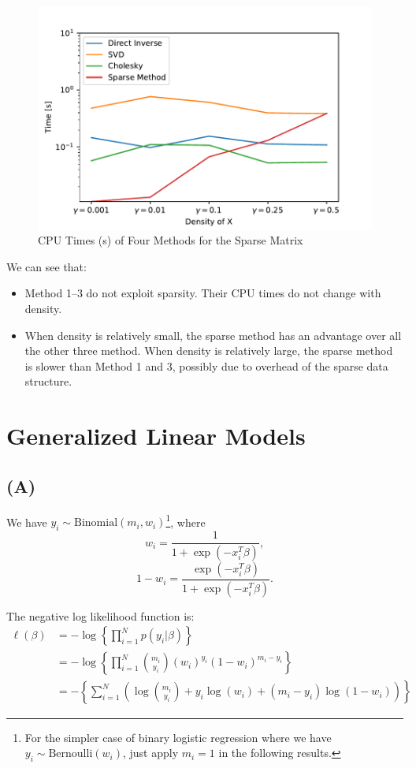 \documentclass[a4paper,11pt]{article}
\begin{document}
\begin{figure}[!h]
\caption{CPU Times (s) of Four Methods for the Sparse Matrix}
\centering
\includegraphics[width = \textwidth]{fig1}
\end{figure}

We can see that:
\begin{itemize}
	\item Method 1--3 do not exploit sparsity. Their CPU times do not change with density.
	\item When density is relatively small, the sparse method has an advantage over all the other three method. When density is relatively large, the sparse method is slower than Method 1 and 3, possibly due to overhead of the sparse data structure.
\end{itemize} 

\section{Generalized Linear Models}

\subsection{(A)}
We have $y_i \sim \text{Binomial}(m_i, w_i)$\footnote{For the simpler case of binary logistic regression where we have $y_i \sim \text{Bernoulli}(w_i)$, just apply $m_i = 1$ in the following results.}, where 
$$
		w_i = \frac{1}{1+\exp(-x_i^T\beta)},
$$
$$
1-w_i = \frac{\exp(-x_i^T\beta)}{1+\exp(-x_i^T\beta)}.
$$

The negative log likelihood function is:
\begin{align}
		\ell(\beta) &= -\log \left \{ \prod_{i=1}^N p(y_i | \beta)  \right \} \\
		&= -\log \left \{ \prod_{i=1}^N \binom {m_i}{y_i}(w_i)^{y_i}(1-w_i)^{m_i-y_i}  \right \} \\
		&= - \left \{ \sum_{i=1}^{N} \left ( \log\binom {m_i}{y_i} + y_i \log(w_i) + (m_i-y_i)\log(1-w_i) \right ) \right \} 
	\end{align}
	
\end{document}
